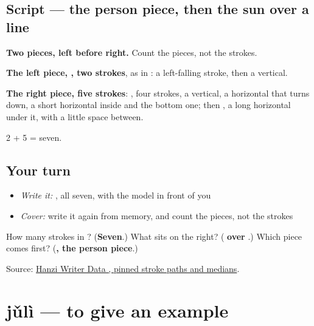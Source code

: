 \subsection*{Script — the person piece, then the sun over a line}

\begin{quote}
\end{quote}

\textbf{Two pieces, left before right.} Count the pieces, not the strokes.

\textbf{The left piece, , two strokes}, as in : a left-falling stroke, then a vertical.

\textbf{The right piece, five strokes}: , four strokes, a vertical, a horizontal that turns down, a short horizontal inside and the bottom one; then , a long horizontal under it, with a little space between.

2 + 5 = seven.

\subsection*{Your turn}
\begin{itemize}
\raggedright
  \item \emph{Write it:} , all seven, with the model in front of you
  \item \emph{Cover:} write it again from memory, and count the pieces, not the strokes
\end{itemize}

\begin{tcolorbox}[breakable,colback=teal!4,colframe=teal!35!black,title={Before you move on}]
How many strokes in ? (\textbf{Seven}.) What sits on the right? (\textbf{ over }.) Which piece comes first? (\textbf{, the person piece}.)

Source: \href{https://raw.githubusercontent.com/chanind/hanzi-writer-data/68d10a4b21150cae5e1ebbd223eed289cf32d90c/data/\%E4\%BD\%86.json}{Hanzi Writer Data , pinned stroke paths and medians}.
\end{tcolorbox}
\section[jǔlì]{jǔlì — to give an example}

\label{lesson:ZH-C369-juli}



